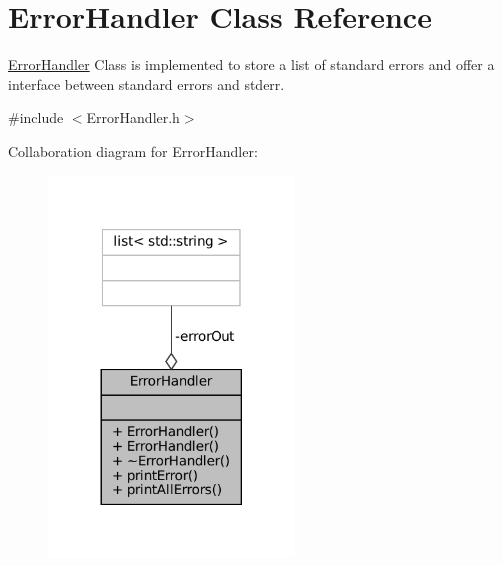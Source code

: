\hypertarget{classErrorHandler}{}\section{Error\+Handler Class Reference}
\label{classErrorHandler}


\mbox{\hyperlink{classErrorHandler}{Error\+Handler}} Class is implemented to store a list of standard errors and offer a interface between standard errors and stderr.  




{\ttfamily \#include $<$Error\+Handler.\+h$>$}



Collaboration diagram for Error\+Handler\+:
\nopagebreak
\begin{figure}[H]
\begin{center}
\leavevmode
\includegraphics[width=185pt]{classErrorHandler__coll__graph}
\end{center}
\end{figure}
